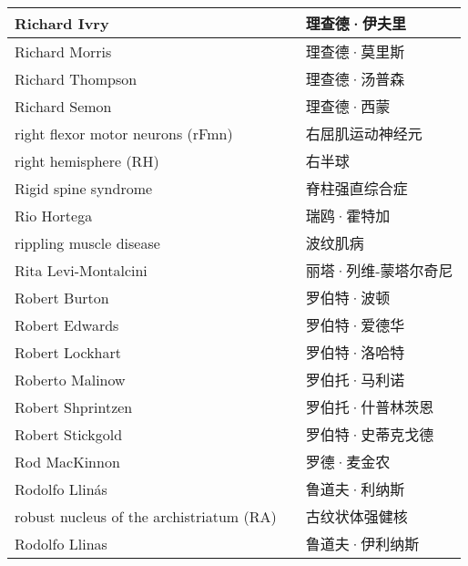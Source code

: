 \begin{longtable}{lll}
	\midrule
	Richard Ivry   && 理查德·伊夫里  \\
	
	\midrule
	Richard Morris   && 理查德·莫里斯  \\
	
	\midrule
	Richard Thompson   && 理查德·汤普森  \\
	
	\midrule
	Richard Semon   && 理查德·西蒙  \\
	
	\midrule
	right flexor motor neurons (rFmn)   && 右屈肌运动神经元  \\
	
	\midrule
	right hemisphere (RH)  && 右半球  \\
	
	\midrule
	Rigid spine syndrome  && 脊柱强直综合症  \\
	
	\midrule
	Rio Hortega   && 瑞鸥·霍特加  \\
	
	\midrule
	rippling muscle disease   && 波纹肌病  \\
	
	\midrule
	Rita Levi-Montalcini   && 丽塔·列维-蒙塔尔奇尼  \\
	
	\midrule
	Robert Burton   && 罗伯特·波顿  \\
	
	\midrule
	Robert Edwards   && 罗伯特·爱德华  \\
	
	\midrule
	Robert Lockhart   && 罗伯特·洛哈特  \\
	
	\midrule
	Roberto Malinow   && 罗伯托·马利诺  \\
	
	\midrule
	Robert Shprintzen   && 罗伯托·什普林茨恩  \\
	
	\midrule
	Robert Stickgold   && 罗伯特·史蒂克戈德  \\
	
	\midrule
	Rod MacKinnon   && 罗德·麦金农  \\
	
	\midrule
	Rodolfo Llinás   && 鲁道夫·利纳斯  \\
	
	\midrule
	robust nucleus of the archistriatum (RA)   && 古纹状体强健核  \\
	
	\midrule
	Rodolfo Llinas   && 鲁道夫·伊利纳斯  \\
	

\end{longtable}
